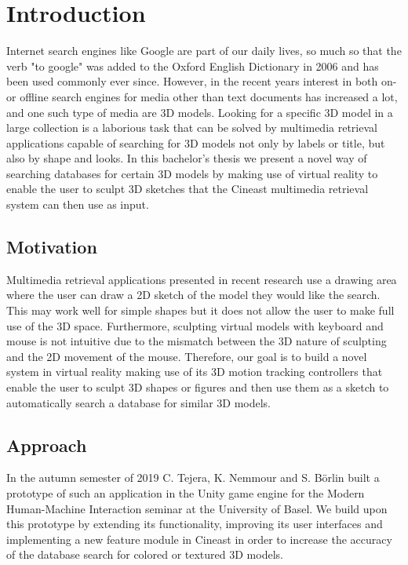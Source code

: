 \chapter{Introduction}

Internet search engines like Google are part of our daily lives, so much so that the verb "to google" was added to the Oxford English Dictionary in 2006 and has been used commonly ever since. However, in the recent years interest in 
both on- or offline search engines for media other than text documents has increased a lot, and one such type of media are 3D models. Looking for a specific 3D model in a large collection is a laborious task that can be solved by multimedia retrieval applications capable of searching for 3D models not only by labels or title, but also by shape and looks. In this bachelor's thesis we present a novel way of searching databases for certain 3D models by making use of virtual reality to enable the user to sculpt 3D sketches that the Cineast multimedia retrieval system can then use as input.

\section{Motivation}

Multimedia retrieval applications presented in recent research use a drawing area where the user can draw a 2D sketch of the model they would like the search. This may work well for simple shapes but it does not allow the user to make full use of the 3D space. Furthermore, sculpting virtual models with keyboard and mouse is not intuitive due to the mismatch between the 3D nature of sculpting and the 2D movement of the mouse. Therefore, our goal is to build a novel system in virtual reality making use of its 3D motion tracking controllers that enable the user to sculpt 3D shapes or figures and then use them as a sketch to automatically search a database for similar 3D models.

\section{Approach}

In the autumn semester of 2019 C. Tejera, K. Nemmour and S. Börlin built a prototype of such an application in the Unity game engine for the Modern Human-Machine Interaction seminar at the University of Basel.
We build upon this prototype by extending its functionality, improving its user interfaces and implementing a new feature module in Cineast in order to increase the accuracy of the database search for colored or textured 3D models.